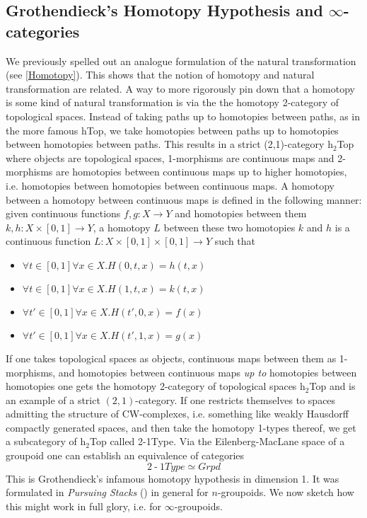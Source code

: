 \subsection{Grothendieck's Homotopy Hypothesis and \texorpdfstring{$\infty$}{infinity}-categories \extra}\label{ooHomotopyHypothesis}
\begin{ex}\label{Homotopy2Top}
    We previously spelled out an analogue formulation of the natural transformation (see \ref{Homotopy}). This shows that the notion of homotopy and natural transformation are related. A way to more rigorously pin down that a homotopy is some kind of natural transformation is via the the homotopy 2-category of topological spaces. Instead of taking paths up to homotopies between paths, as in the more famous hTop, we take homotopies between paths up to homotopies between homotopies between paths. This results in a strict (2,1)-category h$_2$Top where objects are topological spaces, 1-morphisms are continuous maps and 2-morphisms are homotopies between continuous maps up to higher homotopies, i.e. homotopies between homotopies between continuous maps. A homotopy between a homotopy between continuous maps is defined in the following manner: given continuous functions $f,g:X\to Y$ and homotopies between them $k,h:X\times [0,1]\to Y$, a homotopy $L$ between these two homotopies $k$ and $h$ is a continuous function $L:X\times [0,1]\times[0,1]\to Y$ such that 
    \begin{itemize}
        \item $\forall t\in [0,1]\forall x\in X. H(0,t,x)=h(t,x)$
        \item $\forall t\in [0,1]\forall x\in X. H(1,t,x)=k(t,x)$
        \item $\forall t'\in [0,1]\forall x\in X. H(t',0,x)=f(x)$
        \item $\forall t'\in [0,1]\forall x\in X. H(t',1,x)=g(x)$
    \end{itemize}
    If one takes topological spaces as objects, continuous maps between them as 1-morphisms, and homotopies between continuous maps \emph{up to} homotopies between homotopies one gets the homotopy 2-category of topological spaces h$_2$Top and is an example of a strict $(2,1)$-category. If one restricts themselves to spaces admitting the structure of CW-complexes, i.e. something like weakly Hausdorff compactly generated spaces, and then take the homotopy 1-types thereof, we get a subcategory of  h$_2$Top called 2-1Type. Via the Eilenberg-MacLane space of a groupoid one can establish an equivalence of categories 
    $$2\operatorname{-}1Type\simeq Grpd$$
    This is Grothendieck's infamous homotopy hypothesis in dimension 1. It was formulated in
     \emph{Pursuing Stacks} (\cite{grothendieck2021pursuing}) in general for $n$-groupoids. We now
      sketch how this might work in full glory, i.e. for $\infty$-groupoids.
\end{ex}
